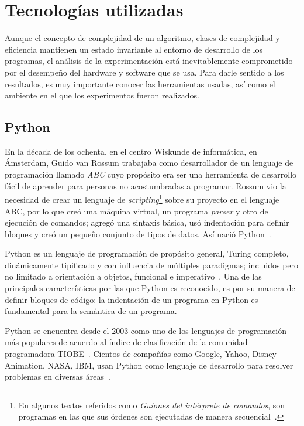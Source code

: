 \chapter{Tecnologías utilizadas}

Aunque el concepto de complejidad de un algoritmo, clases de complejidad y
eficiencia mantienen un estado invariante al entorno de desarrollo de
los programas, el análisis de la experimentación está inevitablemente
comprometido por el desempeño del hardware y software que se usa. Para
darle sentido a los resultados, es muy importante conocer las herramientas 
usadas, así como el ambiente en el que los experimentos fueron realizados.

\section{Python}

En la década de los ochenta, en el centro Wiskunde de informática, en Ámsterdam,
Guido van Rossum trabajaba como desarrollador de un lenguaje de programación
llamado \textit{ABC} cuyo propósito era ser una herramienta de desarrollo
fácil de aprender para personas no acostumbradas a programar. Rossum vio la
necesidad de crear un lenguaje de \textit{scripting}\footnote{En
algunos textos referidos como \textit{Guiones del intérprete de comandos}, son
programas en las que sus órdenes son ejecutadas de manera
secuencial~\cite{interprete-comandos}.} sobre su proyecto en el lenguaje ABC,
por lo que creó una máquina virtual, un programa \emph{parser} y otro de ejecución de
comandos; agregó una sintaxis básica, usó indentación para definir bloques
y creó un pequeño conjunto de tipos de datos. Así nació
Python~\cite{python-interview}.

Python es un lenguaje de programación de propósito general, Turing completo,
dinámicamente tipificado y con influencia de múltiples paradigmas; incluidos
pero no limitado a orientación a objetos, funcional e imperativo~\cite{python}.
Una de las principales características por las que Python es reconocido, es por
su manera de definir bloques de código: la indentación de un programa en Python
es fundamental para la semántica de un programa.

Python se encuentra desde el 2003 como uno de los lenguajes de programación
más populares de acuerdo al índice de clasificación de la comunidad programadora
TIOBE~\cite{tiobe}. Cientos de compañías como Google, Yahoo, Disney Animation,
NASA, IBM, usan Python como lenguaje de desarrollo para resolver
problemas en diversas áreas~\cite{python-usage}.

